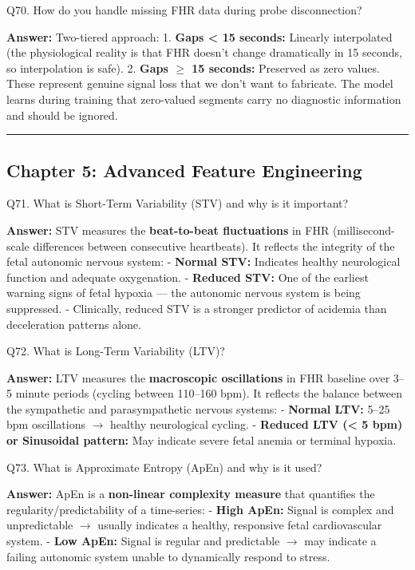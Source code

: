 \documentclass[11pt,a4paper]{article}
\begin{document}
\begin{questionbox}
Q70. How do you handle missing FHR data during probe
disconnection?
\end{questionbox}
\textbf{Answer:} Two-tiered approach: 1. \textbf{Gaps \textless{} 15
seconds:} Linearly interpolated (the physiological reality is that FHR
doesn't change dramatically in 15 seconds, so interpolation is safe). 2.
\textbf{Gaps $\geq$ 15 seconds:} Preserved as zero values. These represent
genuine signal loss that we don't want to fabricate. The model learns
during training that zero-valued segments carry no diagnostic
information and should be ignored.

\begin{center}\rule{0.5\linewidth}{0.5pt}\end{center}

\subsection{Chapter 5: Advanced Feature
Engineering}\label{chapter-5-advanced-feature-engineering}

\begin{questionbox}
Q71. What is Short-Term Variability (STV) and why is it
important?
\end{questionbox}
\textbf{Answer:} STV measures the \textbf{beat-to-beat fluctuations} in FHR
(millisecond-scale differences between consecutive heartbeats). It
reflects the integrity of the fetal autonomic nervous system: -
\textbf{Normal STV:} Indicates healthy neurological function and
adequate oxygenation. - \textbf{Reduced STV:} One of the earliest
warning signs of fetal hypoxia --- the autonomic nervous system is being
suppressed. - Clinically, reduced STV is a stronger predictor of
acidemia than deceleration patterns alone.

\begin{questionbox}
Q72. What is Long-Term Variability (LTV)?
\end{questionbox}
\textbf{Answer:} LTV measures the \textbf{macroscopic oscillations} in FHR
baseline over 3--5 minute periods (cycling between 110--160 bpm). It
reflects the balance between the sympathetic and parasympathetic nervous
systems: - \textbf{Normal LTV:} 5--25 bpm oscillations $\rightarrow$ healthy
neurological cycling. - \textbf{Reduced LTV (\textless{} 5 bpm) or
Sinusoidal pattern:} May indicate severe fetal anemia or terminal
hypoxia.

\begin{questionbox}
Q73. What is Approximate Entropy (ApEn) and why is it used?
\end{questionbox}
\textbf{Answer:} ApEn is a \textbf{non-linear complexity measure} that
quantifies the regularity/predictability of a time-series: -
\textbf{High ApEn:} Signal is complex and unpredictable $\rightarrow$ usually
indicates a healthy, responsive fetal cardiovascular system. -
\textbf{Low ApEn:} Signal is regular and predictable $\rightarrow$ may indicate a
failing autonomic system unable to dynamically respond to stress.
\end{document}
